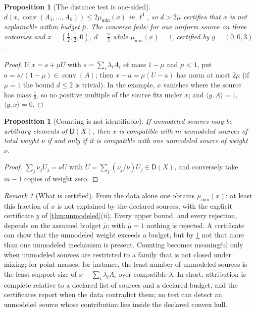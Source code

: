 \documentclass[11pt]{article}
\newtheorem{proposition}[theorem]{Proposition}
\theoremstyle{definition}
\theoremstyle{remark}
\newtheorem{remark}[theorem]{Remark}
\newcommand{\D}{\mathsf{D}}
\begin{document}
\begin{proposition}[The distance test is one-sided]\label{prop:dist-onesided}
$d(x,\operatorname{conv}(A_1,\dots,A_k))\le2\mu_{\min}(x)$ in $\ell^1$, so $d>2\bar\mu$ certifies that
$x$ is not explainable within budget $\bar\mu$. The converse fails: for one uniform source on three
outcomes and $x=(\tfrac12,\tfrac12,0)$, $d=\tfrac23$ while $\mu_{\min}(x)=1$, certified by $y=(0,0,3)$.
\end{proposition}
\begin{proof}
If $x=s+\mu U$ with $s=\sum_i\lambda_iA_i$ of mass $1-\mu$ and $\mu<1$, put $a=s/(1-\mu)\in
\operatorname{conv}(A)$; then $x-a=\mu(U-a)$ has norm at most $2\mu$ (if $\mu=1$ the bound $d\le2$ is
trivial). In the example, $x$ vanishes where the source has mass $\tfrac13$, so no positive multiple of
the source fits under $x$; and $\langle y,A\rangle=1$, $\langle y,x\rangle=0$.
\end{proof}

\begin{proposition}[Counting is not identifiable]\label{prop:counting}
If unmodeled sources may be arbitrary elements of $\D(X)$, then $x$ is compatible with $m$ unmodeled
sources of total weight $\nu$ if and only if it is compatible with one unmodeled source of weight $\nu$.
\end{proposition}
\begin{proof}
$\sum_j\nu_jU_j=\nu U$ with $U=\sum_j(\nu_j/\nu)U_j\in\D(X)$, and conversely take $m-1$ copies of weight
zero.
\end{proof}

\begin{remark}[What is certified]
From the data alone one obtains $\mu_{\min}(x)$: at least this fraction of $x$ is not explained by the
declared sources, with the explicit certificate $y$ of \cref{thm:unmodeled}(ii). Every upper bound, and
every rejection, depends on the assumed budget $\bar\mu$; with $\bar\mu=1$ nothing is rejected. A
certificate can show that the unmodeled weight exceeds a budget, but by \cref{prop:counting} not that
more than one unmodeled mechanism is present. Counting becomes meaningful only when unmodeled
sources are restricted to a family that is not closed under mixing; for point masses, for instance,
the least number of unmodeled sources is the least support size of $x-\sum_i\lambda_iA_i$ over
compatible $\lambda$. In short, attribution is complete relative to a declared list of sources and a
declared budget, and the certificates report when the data contradict them; no test can detect an
unmodeled source whose contribution lies inside the declared convex hull.
\end{remark}
\end{document}
